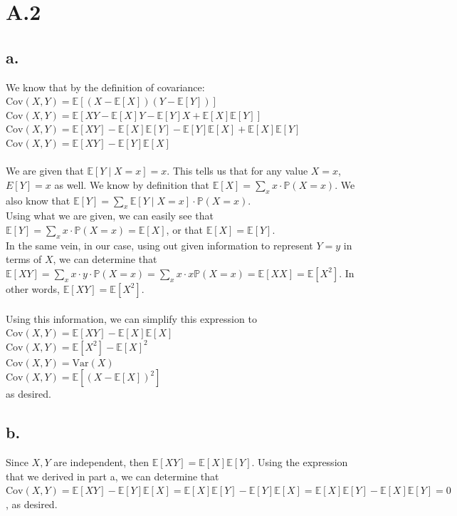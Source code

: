 \documentclass{article}
\newcommand{\1}{\mathbf{1}}
\newcommand{\E}{\mathbb{E}}
\renewcommand{\P}{\mathbb{P}}
\begin{document}
\section*{A.2}
{\Large

\subsection*{a.}
We know that by the definition of covariance: \\
$\text{Cov}(X,Y)=\E[(X-\E[X])(Y-\E[Y])]$ \\
$\text{Cov}(X,Y)=\E[XY - \E[X]Y - \E[Y]X + \E[X]\E[Y]]$ \\
$\text{Cov}(X,Y)=\E[XY] - \E[X]\E[Y] - \E[Y]\E[X] + \E[X]\E[Y]$ \\
$\text{Cov}(X,Y)=\E[XY] - \E[Y]\E[X]$ \\ \\
We are given that $\E[Y \mid X=x ] = x$. This tells us that for any value $X = x$, $E[Y] = x$ as well. We know by definition that $\E[X] = \sum_{x} x \cdot \P(X = x)$. We also know that $\E[Y] = \sum_{x} \E[Y \mid X = x] \cdot \P(X = x)$. \\
Using what we are given, we can easily see that $\E[Y] = \sum_{x} x \cdot \P(X = x) = \E[X]$, or that $\E[X] = \E[Y]$. \\
In the same vein, in our case, using out given information to represent $Y = y$ in terms of $X$, we can determine that $\E[XY] = \sum_x x \cdot y \cdot \P(X = x) = \sum_x x \cdot x \P(X = x) = \E[XX] = \E[X^2]$. In other words, $\E[XY] = \E[X^2]$.\\ \\
Using this information, we can simplify this expression to \\
$\text{Cov}(X,Y)= \E[XY] - \E[X]\E[X]$ \\
$\text{Cov}(X,Y)= \E[X^2] - \E[X]^2$ \\
$\text{Cov}(X,Y)= \text{Var}(X)$ \\
$\text{Cov}(X,Y)= \E[(X - \E[X])^2]$ \\
as desired.

\subsection*{b.}
Since $X, Y$ are independent, then $\E[XY] = \E[X]\E[Y]$. Using the expression that we derived in part a, we can determine that $\text{Cov}(X,Y)=\E[XY] - \E[Y]\E[X] = \E[X]\E[Y] - \E[Y]\E[X] = \E[X]\E[Y] - \E[X]\E[Y] = 0$, as desired.

}
\end{document}
